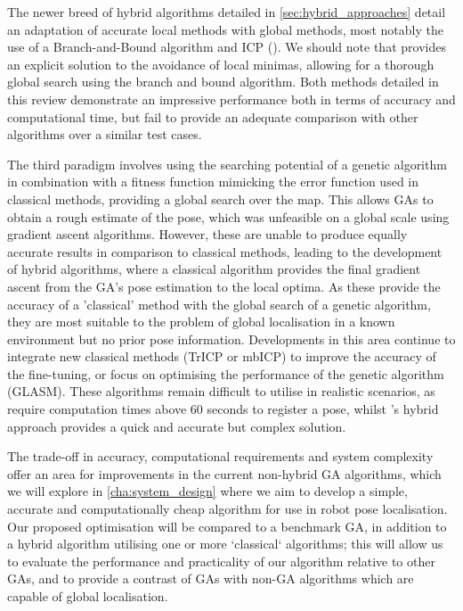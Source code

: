 \documentclass[authoryearcitations]{UoYCSproject}
\begin{document}
The newer breed of hybrid algorithms detailed in \autoref{sec:hybrid_approaches} detail an adaptation of accurate local methods with global methods, most notably the use of a Branch-and-Bound algorithm and ICP (\citet{Yang2013-gx}). We should note that \citet{Yang2013-gx} provides an explicit solution to the avoidance of local minimas, allowing for a thorough global search using the branch and bound algorithm. Both methods detailed in this review demonstrate an impressive performance both in terms of accuracy and computational time, but fail to provide an adequate comparison with other algorithms over a similar test cases.  \newline

The third paradigm involves using the searching potential of a genetic algorithm in combination with a fitness function mimicking the error function used in classical methods, providing a global search over the map. This allows GAs to obtain a rough estimate of the pose, which was unfeasible on a global scale using gradient ascent algorithms. However, these are unable to produce equally accurate results in comparison to classical methods, leading to the development of hybrid algorithms, where a classical algorithm provides the final gradient ascent from the GA's pose estimation to the local optima. As these provide the accuracy of a 'classical' method with the global search of a genetic algorithm, they are most suitable to the problem of global localisation in a known environment but no prior pose information. Developments in this area continue to integrate new classical methods (TrICP or mbICP) to improve the accuracy of the fine-tuning, or focus on optimising the performance of the genetic algorithm (GLASM). These algorithms remain difficult to utilise in realistic scenarios, as \citet{Chow2004-xc} require computation times above 60 seconds to register a pose, whilst \citet{Lenac2011-co}'s hybrid approach provides a quick and accurate but complex solution. \newline

The trade-off in accuracy, computational requirements and system complexity offer an area for improvements in the current non-hybrid GA algorithms, which we will explore in \autoref{cha:system_design} where we aim to develop a simple, accurate and computationally cheap algorithm for use in robot pose localisation. Our proposed optimisation will be compared to a benchmark GA, in addition to a hybrid algorithm utilising one or more `classical` algorithms; this will allow us to evaluate the performance and practicality of our algorithm relative to other GAs, and to provide a contrast of GAs with non-GA algorithms which are capable of global localisation.
\end{document}
